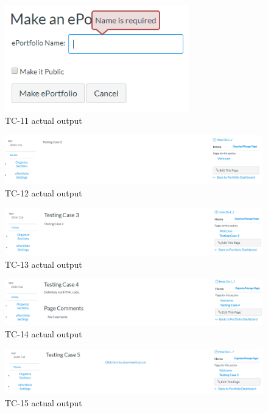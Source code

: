 \documentclass[10pt,letterpaper]{article}
\begin{document}
\newpage
\begin{figure}[h!]
	\centerline{\includegraphics[width=8cm]{screenshots/tc11-actual-output.png}}
	\caption{TC-11 actual output}
\end{figure}
\begin{figure}[h!]
	\centerline{\includegraphics[width=\textwidth]{screenshots/tc12-actual-output.png}}
	\caption{TC-12 actual output}
\end{figure}
\pagebreak
\begin{figure}[h!]
	\centerline{\includegraphics[width=\textwidth]{screenshots/tc13-actual-output.png}}
	\caption{TC-13 actual output}
\end{figure}
\begin{figure}[h!]
	\centerline{\includegraphics[width=\textwidth]{screenshots/tc14-actual-output.png}}
	\caption{TC-14 actual output}
\end{figure}
\begin{figure}[h!]
	\centerline{\includegraphics[width=\textwidth]{screenshots/tc15-actual-output.png}}
	\caption{TC-15 actual output}
\end{figure}
\end{document}
